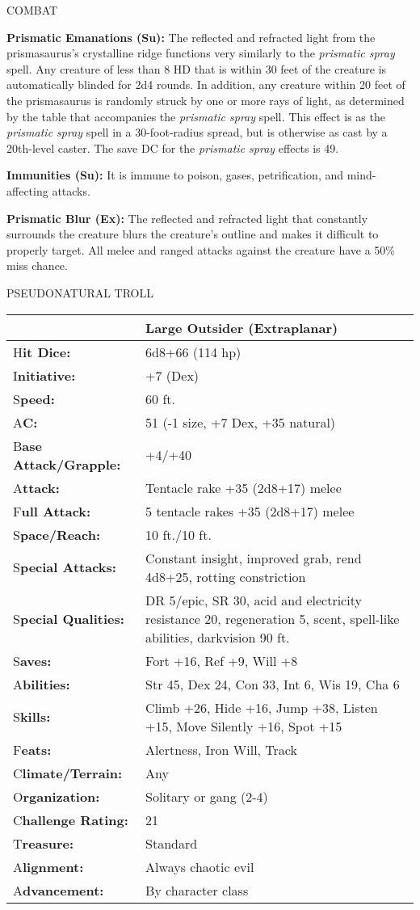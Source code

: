 \documentclass{article}
\begin{document}
{COMBAT 

\textbf{Prismatic Emanations (Su):} The reflected and refracted light from the 
prismasaurus's crystalline ridge functions very similarly to the \textit{prismatic 
spray }spell. Any creature of less than 8 HD that is within 30 feet of the creature 
is automatically blinded for 2d4 rounds. In addition, any creature within 20 feet 
of the prismasaurus is randomly struck by one or more rays of light, as determined 
by the table that accompanies the \textit{prismatic spray }spell\textit{. }This 
effect is as the \textit{prismatic spray }spell in a 30-foot-radius spread, but 
is otherwise as cast by a 20th-level caster. The save DC for the \textit{prismatic 
spray} effects is 49.

\textbf{Immunities (Su): }It is immune to poison, gases, petrification, and mind-affecting 
attacks. 

\textbf{Prismatic Blur (Ex):} The reflected and refracted light that constantly 
surrounds the creature blurs the creature's outline and makes it difficult to properly 
target. All melee and ranged attacks against the creature have a 50\% miss chance. 

\vspace{12pt}
{\LARGE{}PSEUDONATURAL TROLL }

\begin{tabular}{|>{\raggedright}p{65pt}|>{\raggedright}p{260pt}|}
\hline
  & Large Outsider (Extraplanar)\tabularnewline
\hline
H\textbf{it Dice:} & 6d8+66 (114 hp) \tabularnewline
\hline
I\textbf{nitiative:} & +7 (Dex) \tabularnewline
\hline
S\textbf{peed:} & 60 ft. \tabularnewline
\hline
A\textbf{C:} & 51 (-1 size, +7 Dex, +35 natural) \tabularnewline
\hline
B\textbf{ase Attack/Grapple:} & +4/+40\tabularnewline
\hline
A\textbf{ttack:} & Tentacle rake +35 (2d8+17) melee\tabularnewline
\hline
F\textbf{ull Attack:} & 5 tentacle rakes +35 (2d8+17) melee\tabularnewline
\hline
S\textbf{pace/Reach:} & 10 ft./10 ft. \tabularnewline
\hline
S\textbf{pecial Attacks:} & Constant insight, improved grab, rend 4d8+25, rotting 
constriction \tabularnewline
\hline
S\textbf{pecial Qualities:} & DR 5/epic, SR 30, acid and electricity resistance 
20, regeneration 5, scent, spell-like abilities, darkvision 90 ft. \tabularnewline
\hline
S\textbf{aves:} & Fort +16, Ref +9, Will +8 \tabularnewline
\hline
A\textbf{bilities:} & Str 45, Dex 24, Con 33, Int 6, Wis 19, Cha 6 \tabularnewline
\hline
S\textbf{kills:} & Climb +26, Hide +16, Jump +38, Listen +15, Move Silently +16, 
Spot +15\tabularnewline
\hline
F\textbf{eats:} & Alertness, Iron Will, Track \tabularnewline
\hline
C\textbf{limate/Terrain:} & Any \tabularnewline
\hline
O\textbf{rganization:} & Solitary or gang (2-4) \tabularnewline
\hline
C\textbf{hallenge Rating:} & 21 \tabularnewline
\hline
T\textbf{reasure:} & Standard \tabularnewline
\hline
A\textbf{lignment:} & Always chaotic evil \tabularnewline
\hline
A\textbf{dvancement:} & By character class \tabularnewline
\hline
\end{tabular}

}
\end{document}
